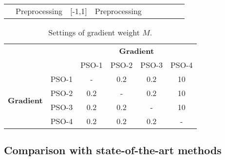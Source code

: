 \documentclass[fleqn,10pt]{wlscirep}
\begin{document}
\begin{table}[htb]
{\begin{tabular}{l|l|l|l|lllll}
\multicolumn{1}{|l|}{}                      & Preprocessing      & [-1,1]         & Preprocessing              &                       &                                              &                                                &                                     &                                              \\ \cline{1-4}
\end{tabular}
}
\end{table} \begin{table}[!htb]
\centering
\caption{Settings of gradient weight $M$.}
\label{tab:table_pso_settings}
\begin{tabular}{ll|cccc|}
\cline{3-6}
                                                &       & \multicolumn{4}{c|}{\textbf{Gradient}}                                                                \\ \cline{3-6} 
                                                &       & \multicolumn{1}{c|}{PSO-1} & \multicolumn{1}{c|}{PSO-2} & \multicolumn{1}{c|}{PSO-3} & PSO-4 \\ \hline
\multicolumn{1}{|l|}{\multirow{4}{*}{\textbf{Gradient}}} & PSO-1 & \multicolumn{1}{c|}{-}     & \multicolumn{1}{c|}{0.2}   & \multicolumn{1}{c|}{0.2}   & 10    \\ \cline{2-6} 
\multicolumn{1}{|l|}{}                          & PSO-2 & \multicolumn{1}{c|}{0.2}   & \multicolumn{1}{c|}{-}     & \multicolumn{1}{c|}{0.2}   & 10    \\ \cline{2-6} 
\multicolumn{1}{|l|}{}                          & PSO-3 & \multicolumn{1}{c|}{0.2}   & \multicolumn{1}{c|}{0.2}   & \multicolumn{1}{c|}{-}     & 10    \\ \cline{2-6} 
\multicolumn{1}{|l|}{}                          & PSO-4 & \multicolumn{1}{c|}{0.2}   & \multicolumn{1}{c|}{0.2}   & \multicolumn{1}{c|}{0.2}   & -     \\ \hline
\end{tabular}
\end{table} \subsection{Comparison with state-of-the-art methods}
\label{sec:stateoftheart}
\end{document}
